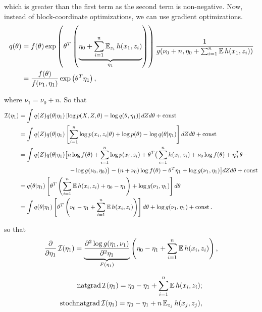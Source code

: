 which is greater than the first term as the second term is non-negative. Now, instead of block-coordinate optimizations, we can use gradient optimizations.
\begin{equation*}
    \begin{aligned}
        q(\theta) &= f(\theta) \exp \left( \theta^T \left( \underbrace{\eta_0 + \sum_{i = 1}^n \operatorname{\mathbb{E}}_{z_i} h(x_1, z_i)}_{\eta_1}\right) \right) \frac{1}{g(\nu_0 + n, \eta_0 + \sum_{i = 1}^n \operatorname{\mathbb{E}} h(x_1, z_i))} \\ 
        &= \frac{f(\theta)}{f(\nu_1, \eta_1)} \exp \left( \theta^T \eta_1 \right),
    \end{aligned}
\end{equation*}
    
where $\nu_1 = \nu_0 + n$. So that 
\begin{equation*}
    \begin{aligned}
        \operatorname{\mathcal{I}}(\eta_1) &= \int q(Z) q(\theta | \eta_1) \left[\log p(X, Z, \theta) - \log q(\theta, \eta_1) \right] dZ d\theta + \operatorname{const} \\ 
        &= \int q(Z) q(\theta | \eta_1) \left[ \sum_{i = 1}^n \log p(x_i, z_i | \theta) + \log p(\theta) - \log q(\theta | \eta_1) \right] dZ d\theta + \operatorname{const} \\
        &= \int q(Z) q(\theta | \eta_1) \big[ n \log f(\theta) + \sum_{i = 1}^n \log p(x_i, z_i) + \theta^T \big( \sum_{i = 1}^n h(x_i, z_i) + \nu_0 \log f(\theta) + \eta_0^T \theta -\\ 
        &\operatorname{\qquad \qquad \qquad \qquad} - \log g(\nu_0, \eta_0)\big) - (n + \nu_0) \log f(\theta) - \theta^T \eta_1 + \log g(\nu_1, \eta_1)\big] dZ d\theta + \operatorname{const} \\
        &= q(\theta | \eta_1) \left[ \theta^T \left( \sum_{i = 1}^n \operatorname{\mathbb{E}} h(x_i, z_i) + \eta_0 - \eta_1\right) + \log g(\nu_1, \eta_1)\right] d \theta \\ 
        &= \int q(\theta | \eta_1) \left[ \theta^T \left( \nu_0 - \eta_1 + \sum_{i = 1}^n \operatorname{\mathbb{E}} h(x_i, z_i)\right)\right] d \theta + \log g(\nu_1, \eta_1) + \operatorname{const}.
    \end{aligned}
\end{equation*}

so that 
\begin{equation*}
    \frac{\partial}{\partial \eta_1} \operatorname{\mathcal{I}}(\eta_1) = \underbrace{\frac{\partial^2 \log g(\eta_1, \nu_1)}{\partial^2 \eta_1}}_{F(\eta_1)} \left(\eta_0 - \eta_1 + \sum_{i = 1}^n \operatorname{\mathbb{E}} h(x_i, z_i) \right), 
\end{equation*}

\begin{equation*}
    \begin{aligned}
        \operatorname{natgrad} \operatorname{\mathcal{I}}(\eta_1) = \eta_0 - \eta_1 + \sum_{i = 1}^n \operatorname{\mathbb{E}} h(x_i, z_i); \\ 
        \operatorname{stochnatgrad} \operatorname{\mathcal{I}}(\eta_1) = \eta_0 - \eta_1 + n \operatorname{\mathbb{E}}_{z_j} h(x_j, z_j),
    \end{aligned}
\end{equation*}

